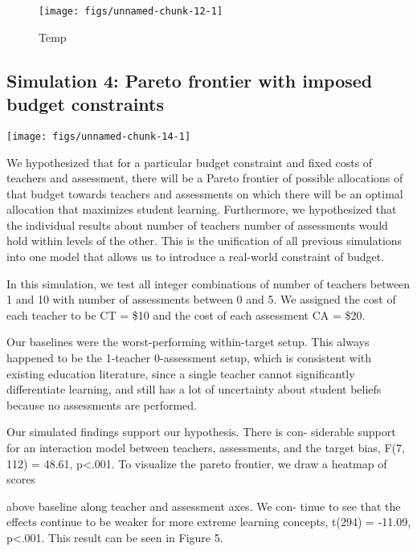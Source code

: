 \documentclass[10pt, letterpaper]{article}
\newenvironment{CodeChunk}{}{}
\begin{document}
\begin{CodeChunk}
\begin{figure}[t]
\texttt{[image: figs/unnamed-chunk-12-1]} \caption[Temp]{Temp}\label{fig:unnamed-chunk-12}
\end{figure}
\end{CodeChunk}

\subsection{Simulation 4: Pareto frontier with imposed budget
constraints}\label{simulation-4-pareto-frontier-with-imposed-budget-constraints}

\begin{CodeChunk}

\texttt{[image: figs/unnamed-chunk-14-1]} \end{CodeChunk}

We hypothesized that for a particular budget constraint and fixed costs
of teachers and assessment, there will be a Pareto frontier of possible
allocations of that budget towards teachers and assessments on which
there will be an optimal allocation that maximizes student learning.
Furthermore, we hypothesized that the individual results about number of
teachers number of assessments would hold within levels of the other.
This is the unification of all previous simulations into one model that
allows us to introduce a real-world constraint of budget.

In this simulation, we test all integer combinations of number of
teachers between 1 and 10 with number of assessments between 0 and 5. We
assigned the cost of each teacher to be CT = \$10 and the cost of each
assessment CA = \$20.

Our baselines were the worst-performing within-target setup. This always
happened to be the 1-teacher 0-assessment setup, which is consistent
with existing education literature, since a single teacher cannot
significantly differentiate learning, and still has a lot of uncertainty
about student beliefs because no assessments are performed.

Our simulated findings support our hypothesis. There is con- siderable
support for an interaction model between teachers, assessments, and the
target bias, F(7, 112) = 48.61, p\textless{}.001. To visualize the
pareto frontier, we draw a heatmap of scores

above baseline along teacher and assessment axes. We con- tinue to see
that the effects continue to be weaker for more extreme learning
concepts, t(294) = -11.09, p\textless{}.001. This result can be seen in
Figure 5.
\end{document}

